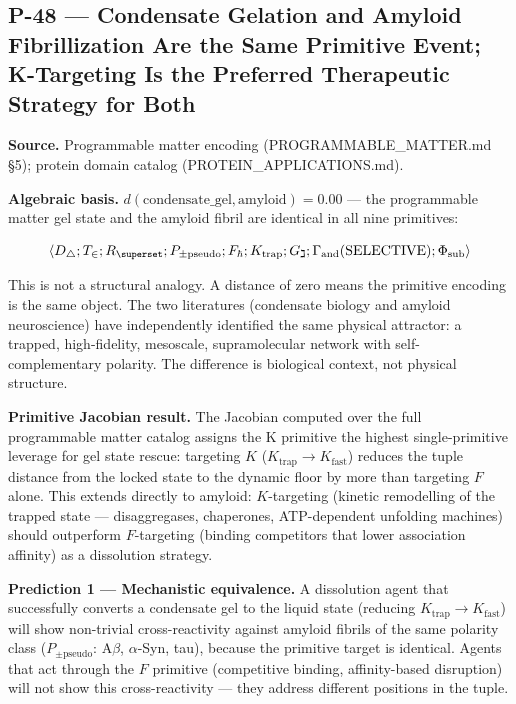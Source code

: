 \documentclass[12pt,a4paper]{article}
\begin{document}
\subsection{P-48 --- Condensate Gelation and Amyloid Fibrillization Are the Same Primitive Event; K-Targeting Is the Preferred Therapeutic Strategy for Both}

\textbf{Source.} Programmable matter encoding (PROGRAMMABLE\_MATTER.md §5); protein domain catalog (PROTEIN\_APPLICATIONS.md).

\textbf{Algebraic basis.} $d(\text{condensate\_gel}, \text{amyloid}) = 0.00$ --- the programmable matter gel state and the amyloid fibril are identical in all nine primitives:

\[\langle D_\triangle; T_\in; R_{\superset}; P_{\pm\text{pseudo}}; F_\hbar; K_\text{trap}; G_\gimel; \Gamma_\text{and}(\text{SELECTIVE}); \Phi_\text{sub} \rangle\]

This is not a structural analogy. A distance of zero means the primitive encoding is the same object. The two literatures (condensate biology and amyloid neuroscience) have independently identified the same physical attractor: a trapped, high-fidelity, mesoscale, supramolecular network with self-complementary polarity. The difference is biological context, not physical structure.

\textbf{Primitive Jacobian result.} The Jacobian computed over the full programmable matter catalog assigns the K primitive the highest single-primitive leverage for gel state rescue: targeting $K$ ($K_\text{trap} \to K_\text{fast}$) reduces the tuple distance from the locked state to the dynamic floor by more than targeting $F$ alone. This extends directly to amyloid: $K$-targeting (kinetic remodelling of the trapped state --- disaggregases, chaperones, ATP-dependent unfolding machines) should outperform $F$-targeting (binding competitors that lower association affinity) as a dissolution strategy.

\textbf{Prediction 1 --- Mechanistic equivalence.} A dissolution agent that successfully converts a condensate gel to the liquid state (reducing $K_\text{trap} \to K_\text{fast}$) will show non-trivial cross-reactivity against amyloid fibrils of the same polarity class ($P_{\pm\text{pseudo}}$: A$\beta$, $\alpha$-Syn, tau), because the primitive target is identical. Agents that act through the $F$ primitive (competitive binding, affinity-based disruption) will not show this cross-reactivity --- they address different positions in the tuple.
\end{document}
